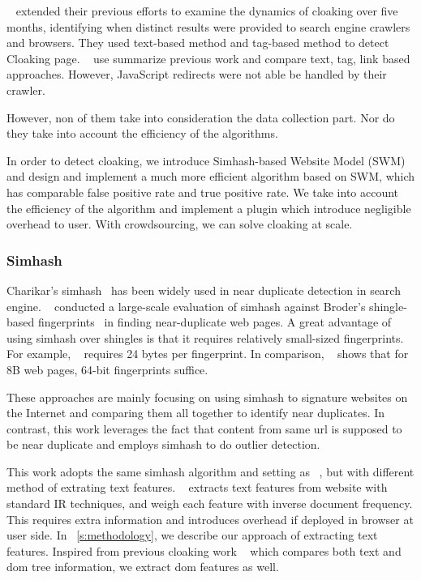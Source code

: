  ~\cite{wang2011cloak}
 extended their previous efforts to examine the dynamics of cloaking over five
 months, identifying when distinct results were provided to search engine
 crawlers and browsers.
They used text-based method and tag-based method to detect Cloaking page.
 ~\cite{deng2013uncovering} use summarize previous work and compare text, tag,
 link based approaches. However, JavaScript redirects were not able be handled by their crawler.

However, non of them take into consideration the data collection part. Nor do
they take into account the efficiency of the algorithms.

In order to detect cloaking, we introduce Simhash-based Website Model (SWM) and
design and implement a much more efficient algorithm based on SWM, which has
comparable false positive rate and true positive rate. We take into account the
efficiency of the algorithm and implement a plugin which introduce negligible
overhead to user. With crowdsourcing, we can solve cloaking at scale.


\subsubsection{Simhash}
Charikar's simhash~\cite{charikar2002similarity} has been widely used in near
duplicate detection in search engine. ~\cite{henzinger2006finding}
conducted a large-scale evaluation of simhash against Broder's shingle-based
fingerprints~\cite{broder1997syntactic} in finding near-duplicate web pages.
A great advantage of using simhash over shingles is that it
requires relatively small-sized fingerprints.
For example, ~\cite{broder1997syntactic} requires 24 bytes per fingerprint.
In comparison, ~\cite{manku2007detecting} shows that for 8B web pages, 64-bit
fingerprints suffice.

These approaches are mainly focusing on using simhash to signature websites on
the Internet and comparing them all together to identify near duplicates.
In contrast, this work leverages the fact that content from same url is supposed
to be near duplicate and employs simhash to do outlier detection.

This work adopts the same simhash algorithm and setting as 
~\cite{manku2007detecting}, but with different method of extrating text
features. ~\cite{manku2007detecting} extracts text features from website with
standard IR techniques, and weigh each feature with inverse document frequency.
This requires extra information and introduces overhead if deployed in browser at user side.
In ~\autoref{s:methodology}, we describe our approach of extracting text features.
Inspired from previous cloaking work ~\cite{wang2011cloak} which compares both
text and dom tree information, we extract dom features as well.



